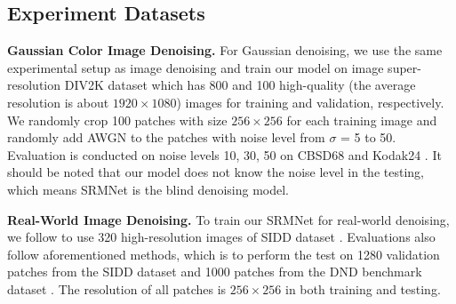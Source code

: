 \documentclass{article}
\begin{document}
\subsection{Experiment Datasets}
\noindent\textbf{Gaussian Color Image Denoising.} For Gaussian denoising, we use the same experimental setup as image denoising \cite{14,15} and train our model on image super-resolution DIV2K \cite{39} dataset which has 800 and 100 high-quality (the average resolution is about $1920 \times 1080$) images for training and validation, respectively. We randomly crop 100 patches with size $256 \times 256$ for each training image and randomly add AWGN to the patches with noise level from $\sigma$ = 5 to 50. Evaluation is conducted on noise levels 10, 30, 50 on CBSD68 \cite{35} and Kodak24 \cite{36}. It should be noted that our model does not know the noise level in the testing, which means SRMNet is the blind denoising model.

\noindent\textbf{Real-World Image Denoising.} To train our SRMNet for real-world denoising, we follow \cite{20, 30} to use 320 high-resolution images of SIDD dataset \cite{40}. Evaluations also follow aforementioned methods, which is to perform the test on 1280 validation patches from the SIDD dataset \cite{40} and 1000 patches from the DND benchmark dataset \cite{41}. The resolution of all patches is $256 \times 256$ in both training and testing.
\end{document}
